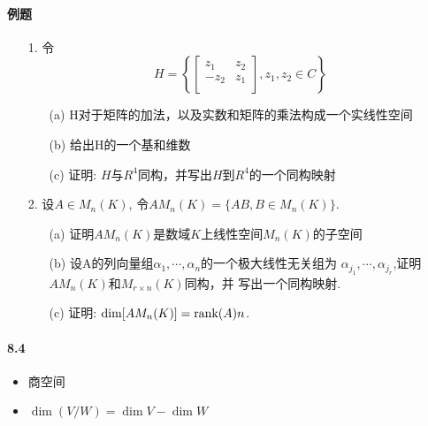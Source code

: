 \paragraph{例题}
\begin{itemize}
  \item[1.]令
  \begin{equation}
  \nonumber
  H = \left\{
    \begin{bmatrix}
      z_1& z_2\\
     -z_2& z_1\\
    \end{bmatrix},
    z_1, z_2 \in C
      \right\}
  \end{equation}
  \begin{itemize}
    \item[(a)] H对于矩阵的加法，以及实数和矩阵的乘法构成一个实线性空间
    \item[(b)] 给出H的一个基和维数
    \item[(c)] 证明: $H$与$R^4$同构，并写出$H$到$R^4$的一个同构映射  
  \end{itemize}
\end{itemize}
\vspace{2cm}

\begin{itemize}
  \item[2.]设$A \in M_n(K)$, 令$AM_n(K) = \{AB, B\in M_n(K) \}$.
  \begin{itemize}
    \item[(a)] 证明$AM_n(K)$是数域$K$上线性空间$M_n(K)$的子空间
    \item[(b)] 设A的列向量组$\alpha_1, \cdots, \alpha_n$的一个极大线性无关组为
    $\alpha_{j_1}, \cdots, \alpha_{j_r}$,证明$AM_n(K)$和$M_{r\times n}(K)$同构，并
    写出一个同构映射. 
    \item[(c)] 证明: $\dim [AM_n(K)] = \rank(A)n$.
  \end{itemize}
\end{itemize}
\vspace{4cm}

\paragraph{8.4}
\begin{itemize}
    \item 商空间
    \item $\dim{(V/W)} = \dim V - \dim W$
\end{itemize}


